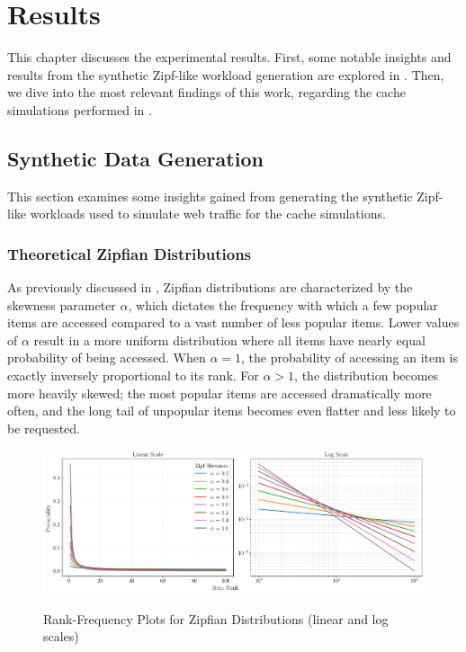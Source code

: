 \chapter{Results}\label{chapter:results}

This chapter discusses the experimental results. First, some notable insights and results from the synthetic Zipf-like workload generation are explored in . Then, we dive into the most relevant findings of this work, regarding the cache simulations performed in .

\section{Synthetic Data Generation}\label{res:zipf-gen}

This section examines some insights gained from generating the synthetic Zipf-like workloads used to simulate web traffic for the cache simulations.

\subsection{Theoretical Zipfian Distributions}\label{theoretical-zipf}

As previously discussed in , Zipfian distributions are characterized by the skewness parameter $\alpha$, which dictates the frequency with which a few popular items are accessed compared to a vast number of less popular items. Lower values of $\alpha$ result in a more uniform distribution where all items have nearly equal probability of being accessed. When $\alpha=1$, the probability of accessing an item is exactly inversely proportional to its rank. For $\alpha>1$, the distribution becomes more heavily skewed; the most popular items are accessed dramatically more often, and the long tail of unpopular items becomes even flatter and less likely to be requested. 

\begin{figure}[h!]
    \centering
    \caption{Rank-Frequency Plots for Zipfian Distributions (linear and log scales)}
    \includegraphics[width=\linewidth]{figures/workloads/zipfian_curves_all_both_no_title.pdf}
    \label{fig:zipf-alpha}
\end{figure}

